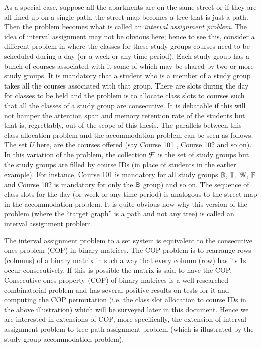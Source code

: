 \documentclass[MS,]{iitmdiss}
\begin{document}
As a special case, suppose all the apartments are on the same
street or if they are all lined up on a single path, the street map
becomes a tree that is just a path. Then the problem becomes what is
called an {\em interval assignment problem}. The idea of interval
assignment may not be obvious here; hence to see this, consider a
different problem in {\WSI} where the classes for these study groups
courses need to be scheduled during a day (or a week or any time
period). Each study group has a bunch of courses associated with it
some of which may be shared by two or more study groups. It is
mandatory that a student who is a member of a study group takes all
the courses associated with that group. There are slots during the day
for classes to be held and the problem is to allocate class slots to
courses such that all the classes of a study group are consecutive. It
is debatable if this will not hamper the attention span and memory
retention rate of the students but that is, regrettably, out of the
scope of this thesis. The parallels between this class allocation
problem and the accommodation problem can be seen as follows. The set
$U$ here, are the courses offered (say Course 101 {\coneohone}, Course
102 {\coneohtwo} and so on). In this variation of the problem, the
collection ${\cal F}$ is the set of study groups but the study groups are
filled by course IDs (in place of students in the earlier
example). For instance, Course 101 is mandatory for all study groups
$\mathbb{B}$, $\mathbb{T}$, $\mathbb{W}$, $\mathbb{F}$ and Course 102 is mandatory for
only the $\mathbb{B}$ group) and so on. The sequence of class slots for the
day (or week or any time period) is analogous to the street map in the
accommodation problem. It is quite obvious now why this version of the
problem (where the ``target graph'' is a path and not any
tree) is called an interval
assignment problem.


The interval assignment problem to a set system is equivalent to the
consecutive ones problem (COP) in binary matrices\cite{wlh02,
  nsnrs09}.  The COP problem is to rearrange rows (columns) of a
binary matrix in such a way that every column (row) has its $1$s occur
consecutively. If this is possible the matrix is said to have the COP.
Consecutive ones property (COP) of binary matrices is a well
researched combinatorial problem and has several positive results on
tests for it and computing the COP permutation (i.e. the class slot
allocation to course IDs in the above illustration) which will be
surveyed later in this document. Hence we are interested in extensions
of COP, more specifically, the extension of interval assignment
problem to tree path assignment problem (which is illustrated by the
study group accommodation problem). 
\end{document}
